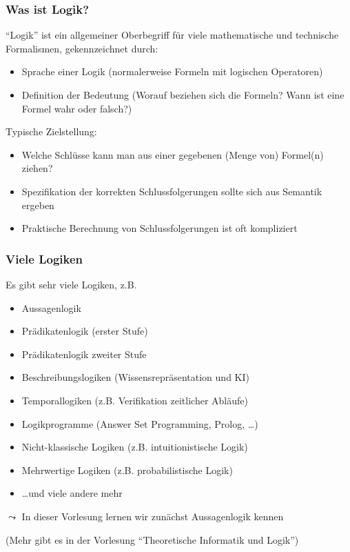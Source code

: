 \documentclass[onlymath]{beamer}
\begin{document}
\begin{frame}\frametitle{Was ist Logik?}
\pause

"`Logik"' ist ein allgemeiner Oberbegriff für viele mathematische und technische Formalismen,
gekennzeichnet durch:
\begin{itemize}
\item {} Sprache einer Logik (normalerweise Formeln mit logischen Operatoren)
\item {} Definition der Bedeutung (Worauf beziehen sich die Formeln? Wann ist eine Formel wahr oder falsch?)
\end{itemize}\bigskip\pause

Typische Zielstellung: 
\begin{itemize}
\item Welche Schlüsse kann man aus einer gegebenen (Menge von) Formel(n) ziehen?
\item Spezifikation der korrekten Schlussfolgerungen sollte sich aus Semantik ergeben
\item Praktische Berechnung von Schlussfolgerungen ist oft kompliziert
\end{itemize}

\end{frame}

\begin{frame}\frametitle{Viele Logiken}

Es gibt sehr viele Logiken, z.B.
\begin{itemize}
\item Aussagenlogik
\item Prädikatenlogik (erster Stufe)
\item Prädikatenlogik zweiter Stufe
\item Beschreibungslogiken (Wissensrepräsentation und KI)
\item Temporallogiken (z.B. Verifikation zeitlicher Abläufe)
\item Logikprogramme (Answer Set Programming, Prolog, \ldots)
\item Nicht-klassische Logiken (z.B. intuitionistische Logik)
\item Mehrwertige Logiken (z.B. probabilistische Logik)
\item \ldots und viele andere mehr
\end{itemize}

$\leadsto$ In dieser Vorlesung lernen wir zunächst \alert{Aussagenlogik} kennen
\bigskip

(Mehr gibt es in der Vorlesung "`Theoretische Informatik und Logik"')

\end{frame}
\end{document}
